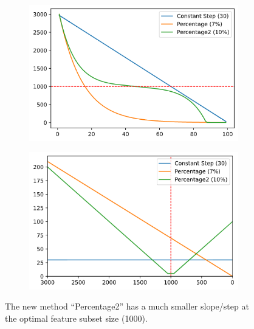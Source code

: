 \begin{figure}[h]
    \centering
    \begin{subfigure}[b]{0.4\linewidth}
        \includegraphics[width=\linewidth]{img/ch5/stopcond/lines.png}
    \end{subfigure}
    \hspace{0.05\linewidth}
    \begin{subfigure}[b]{0.4\linewidth}
        \includegraphics[width=\linewidth]{img/ch5/stopcond/lines2.png}
    \end{subfigure}
    \caption{ The new method “Percentage2” has a much smaller slope/step at the optimal feature subset size (1000).}
    \label{fig:ch5.stopcond.lines}
\end{figure}

